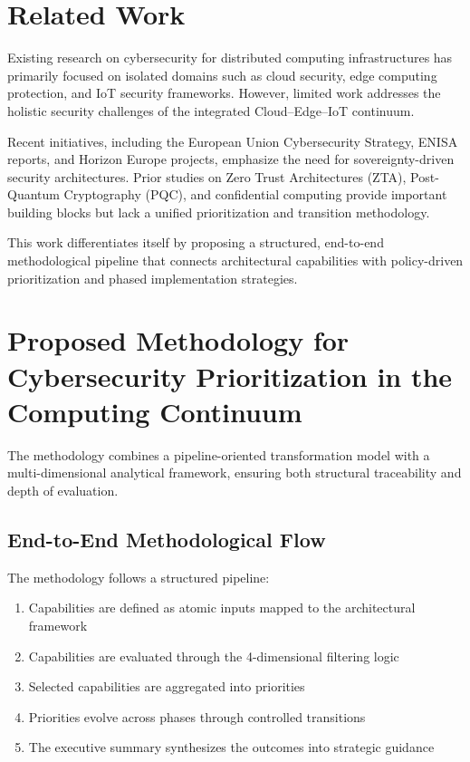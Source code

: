 \documentclass{ieeeaccess}
\begin{document}
 
\section{Related Work}

Existing research on cybersecurity for distributed computing infrastructures has primarily focused on isolated domains such as cloud security, edge computing protection, and IoT security frameworks. However, limited work addresses the holistic security challenges of the integrated Cloud--Edge--IoT continuum.

Recent initiatives, including the European Union Cybersecurity Strategy, ENISA reports, and Horizon Europe projects, emphasize the need for sovereignty-driven security architectures. Prior studies on Zero Trust Architectures (ZTA), Post-Quantum Cryptography (PQC), and confidential computing provide important building blocks but lack a unified prioritization and transition methodology.

This work differentiates itself by proposing a structured, end-to-end methodological pipeline that connects architectural capabilities with policy-driven prioritization and phased implementation strategies.

\section{Proposed Methodology for Cybersecurity Prioritization in the Computing Continuum}

The methodology combines a pipeline-oriented transformation model with a multi-dimensional analytical framework, ensuring both structural traceability and depth of evaluation.

\subsection{End-to-End Methodological Flow}

The methodology follows a structured pipeline:

\begin{enumerate}
    \item Capabilities are defined as atomic inputs mapped to the architectural framework
    \item Capabilities are evaluated through the 4-dimensional filtering logic
    \item Selected capabilities are aggregated into priorities
    \item Priorities evolve across phases through controlled transitions
    \item The executive summary synthesizes the outcomes into strategic guidance
\end{enumerate}
\end{document}
